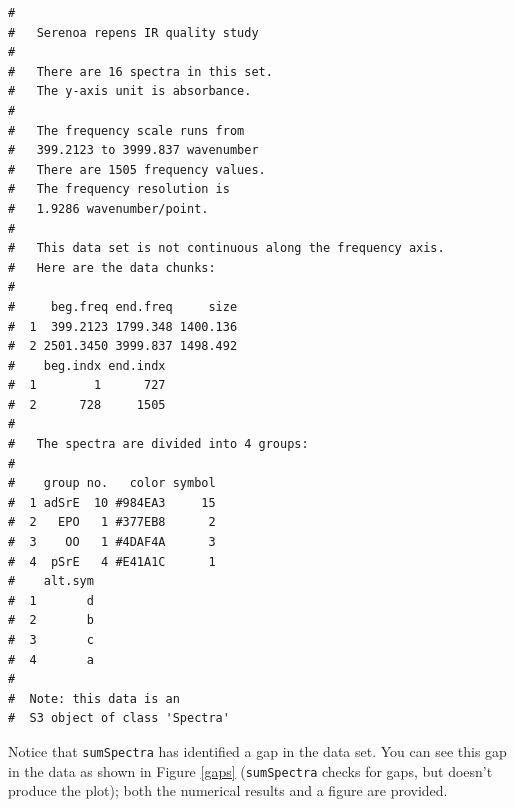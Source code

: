 \documentclass[letter,10pt,twocolumn,twoside,printwatermark=false]{pinp}
\begin{document}
\begin{Shaded}
\begin{Highlighting}[]
\StringTok{ }
  \OperatorTok{$}\OperatorTok{>}\StringTok{ } \OperatorTok{&}
\StringTok{  }\OperatorTok{$}\OperatorTok{<}\StringTok{ }\NormalTok{)}
\end{Highlighting}
\end{Shaded}

\begin{ShadedResult}
\begin{verbatim}
#  
#   Serenoa repens IR quality study 
#  
#   There are 16 spectra in this set.
#   The y-axis unit is absorbance.
#  
#   The frequency scale runs from
#   399.2123 to 3999.837 wavenumber
#   There are 1505 frequency values.
#   The frequency resolution is
#   1.9286 wavenumber/point.
#  
#   This data set is not continuous along the frequency axis.
#   Here are the data chunks:
#  
#     beg.freq end.freq     size
#  1  399.2123 1799.348 1400.136
#  2 2501.3450 3999.837 1498.492
#    beg.indx end.indx
#  1        1      727
#  2      728     1505
#  
#   The spectra are divided into 4 groups: 
#  
#    group no.   color symbol
#  1 adSrE  10 #984EA3     15
#  2   EPO   1 #377EB8      2
#  3    OO   1 #4DAF4A      3
#  4  pSrE   4 #E41A1C      1
#    alt.sym
#  1       d
#  2       b
#  3       c
#  4       a
#  
#  Note: this data is an
#  S3 object of class 'Spectra'
\end{verbatim}
\end{ShadedResult}

Notice that \texttt{sumSpectra} has identified a gap in the data set.
You can see this gap in the data as shown in Figure \ref{gaps}
(\texttt{sumSpectra} checks for gaps, but doesn't produce the plot);
both the numerical results and a figure are provided.

\begin{Shaded}
\begin{Highlighting}[]
\OperatorTok{$}\OperatorTok{$}\NormalTok{data[}\NormalTok{,],}
   \NormalTok{)}
\end{Highlighting}
\end{Shaded}
\end{document}
